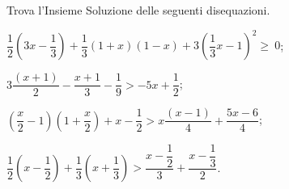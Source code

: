 \begin{esercizio}[\Ast]
 \label{ese:18.17}
Trova l'Insieme Soluzione delle seguenti disequazioni.
 \begin{enumeratea}
 \item $\dfrac{1}{2}\left(3x-\dfrac{1}{3}\right)+\dfrac{1}{3}(1+x)(1-x)+3\left(\dfrac{1}{3}x-1\right)^{2}\ge~0$;
\item $3\dfrac{(x+1)}{2}-\dfrac{x+1}{3}-\dfrac{1}{9}>-5x+\dfrac{1}{2}$;
\item $\left(\dfrac{x}{2}-1\right)\left(1+\dfrac{x}{2}\right)+x-\dfrac{1}{2}>x\dfrac{(x-1)}{4}+\dfrac{5x-6}{4}$;
\item $\dfrac{1}{2}\left(x-\dfrac{1}{2}\right)+\dfrac{1}{3}\left(x+\dfrac{1}{3}\right)>\dfrac{x-\dfrac{1}{2}}{3}+\dfrac{x-\dfrac{1}{3}}{2}$.
\end{enumeratea}
\end{esercizio}
